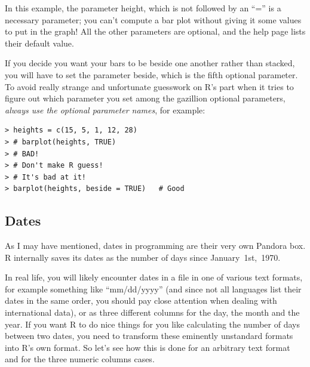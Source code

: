 \documentclass{report}
\newcommand{\code}[1]{\textsf{\ttfamily #1}}
\begin{document}
		In this example, the parameter \code{height}, which is not followed by an ``='' is a necessary parameter; you can't compute a bar plot without giving it some values to put in the graph! All the other parameters are optional, and the help page lists their default value.
	
		If you decide you want your bars to be beside one another rather than stacked, you will have to set the parameter \code{beside}, which is the fifth optional parameter. To avoid really strange and unfortunate guesswork on R's part when it tries to figure out which parameter you set among the gazillion optional parameters, \emph{always use the optional parameter names}, for example:
		\begin{verbatim}
> heights = c(15, 5, 1, 12, 28)
> # barplot(heights, TRUE) 
> # BAD! 
> # Don't make R guess! 
> # It's bad at it!
> barplot(heights, beside = TRUE)	# Good
		\end{verbatim}
		
		\subsection{Dates}\label{subsec:dates}
		As I may have mentioned, dates in programming are their very own Pandora box. R internally saves its dates as the number of days since January~1st,~1970.
		
		In real life, you will likely encounter dates in a file in one of various text formats, for example something like ``mm/dd/yyyy'' (and since not all languages list their dates in the same order, you should pay close attention when dealing with international data), or as three different columns for the day, the month and the year. If you want R to do nice things for you like calculating the number of days between two dates, you need to transform these eminently unstandard formats into R's own format. So let's see how this is done for an arbitrary text format and for the three numeric columns cases.
		
\end{document}
